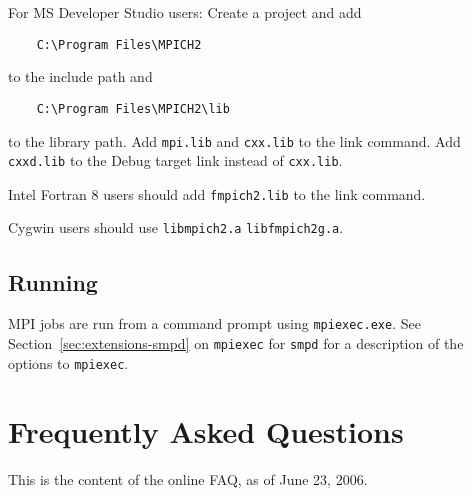 \documentclass[dvipdfm,11pt]{article}
\begin{document}
For MS Developer Studio users: Create a project and add
\begin{verbatim}
    C:\Program Files\MPICH2
\end{verbatim}
to the include path and
\begin{verbatim}
    C:\Program Files\MPICH2\lib
\end{verbatim}
to
the library path.  Add \texttt{mpi.lib} and \texttt{cxx.lib} to the
link command.  Add \texttt{cxxd.lib} to the Debug target link instead of
\texttt{cxx.lib}.

Intel Fortran 8 users should add \texttt{fmpich2.lib} to the link command. 

Cygwin users should use \texttt{libmpich2.a} \texttt{libfmpich2g.a}.

\subsection{Running}
\label{sec:winrun}

MPI jobs are run from a command prompt using \texttt{mpiexec.exe}.  See
Section~\ref{sec:extensions-smpd} on \texttt{mpiexec} for \texttt{smpd}
for a description of the options to \texttt{mpiexec}.

\clearpage
\appendix

\section{Frequently Asked Questions}
This is the content of the online FAQ, as of June 23, 2006.





\end{document}
